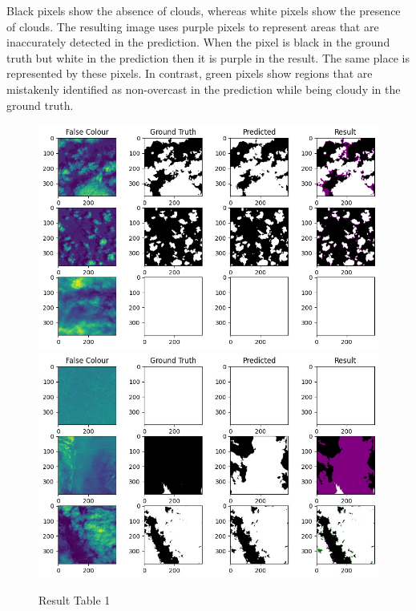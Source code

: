 Black pixels show the absence of clouds, whereas white pixels show the presence of clouds. The resulting image uses purple pixels to represent areas that are inaccurately detected in the prediction. When the pixel is black in the ground truth but white in the prediction then it is purple in the result. The same place is represented by these pixels. In contrast, green pixels show regions that are mistakenly identified as non-overcast in the prediction while being cloudy in the ground truth.
\hfill \break
\begin{figure}[htp]
    \centering
    \includegraphics[width=15cm]{projectChapters/images/result1.png}
    \includegraphics[width=15cm]{projectChapters/images/result2.png}
    \caption{Result Table 1}
    \label{res1}
\end{figure}


